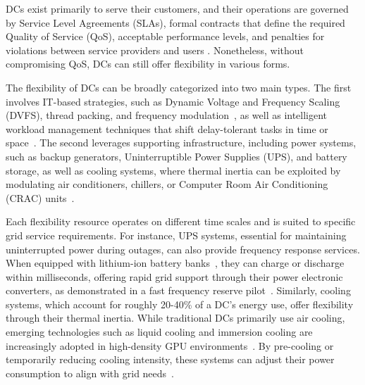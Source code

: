 \documentclass[preprint,12pt]{elsarticle}
\begin{document}
DCs exist primarily to serve their customers, and their operations are governed by Service Level Agreements (SLAs), formal contracts that define the required Quality of Service (QoS), acceptable performance levels, and penalties for violations between service providers and users \cite{arshad2022utilizing}. Nonetheless, without compromising QoS, DCs can still offer flexibility in various forms. 


The flexibility of DCs can be broadly categorized into two main types. The first involves IT-based strategies, such as Dynamic Voltage and Frequency Scaling (DVFS), thread packing, and frequency modulation~\cite{ZHANG2024DR}, as well as intelligent workload management techniques that shift delay-tolerant tasks in time or space~\cite{LIU2013770}. The second leverages supporting infrastructure, including power systems, such as backup generators, Uninterruptible Power Supplies (UPS), and battery storage, as well as cooling systems, where thermal inertia can be exploited by modulating air conditioners, chillers, or Computer Room Air Conditioning (CRAC) units~\cite{Takci2025}.

Each flexibility resource operates on different time scales and is suited to specific grid service requirements. For instance, UPS systems, essential for maintaining uninterrupted power during outages, can also provide frequency response services. When equipped with lithium-ion battery banks~\cite{tomaszewska2019lithium}, they can charge or discharge within milliseconds, offering rapid grid support through their power electronic converters, as demonstrated in a fast frequency reserve pilot~\cite{Alapera2019}. Similarly, cooling systems, which account for roughly 20-40\% of a DC's energy use, offer flexibility through their thermal inertia. While traditional DCs primarily use air cooling, emerging technologies such as liquid cooling and immersion cooling are increasingly adopted in high-density GPU environments~\cite{crozier2025potential}. By pre-cooling or temporarily reducing cooling intensity, these systems can adjust their power consumption to align with grid needs~\cite{Cui2024, JerezMonsalves2023}.
\end{document}
